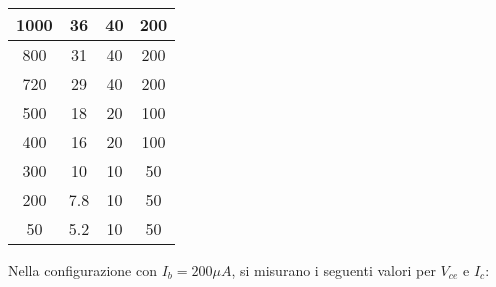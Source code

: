 \documentclass{article}
\begin{document}
\begin{table}[H]
\begin{tabular}{|c|c|c|c|}
        1000          & 36            & 40               & 200                  \\ \hline
        800           & 31            & 40               & 200                  \\ \hline
        720           & 29            & 40               & 200                  \\ \hline
        500           & 18            & 20               & 100                  \\ \hline
        400           & 16            & 20               & 100                  \\ \hline
        300           & 10            & 10               & 50                   \\ \hline
        200           & 7.8           & 10               & 50                   \\ \hline
        50            & 5.2           & 10               & 50                   \\ \hline
    \end{tabular}
\end{table}

Nella configurazione con $I_b=200\mu A$, si misurano i seguenti valori per $V_{ce}$ e $I_c$:
\end{document}
